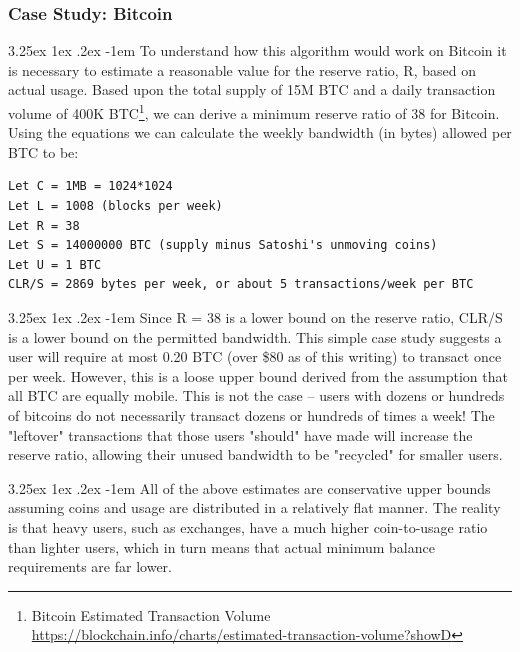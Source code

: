 \documentclass{article}
\makeatletter
\renewcommand\paragraph{\@startsection{paragraph}{5}{\z@}%
  {3.25ex \@plus1ex \@minus.2ex}%
  {-1em}%
  {\normalfont\normalsize\bfseries}}
\makeatother
\begin{document}
            \subsubsection{Case Study: Bitcoin}

                \paragraph{}
                    To understand how this algorithm would work on Bitcoin
it is necessary to estimate a reasonable value for the reserve ratio, R,
based on actual usage. Based upon the total supply of 15M BTC and a daily
transaction volume of 400K BTC\footnote{Bitcoin Estimated Transaction
Volume\newline
\url{https://blockchain.info/charts/estimated-transaction-volume?showD}},
we can derive a minimum reserve ratio of 38 for Bitcoin. Using the
equations we can calculate the weekly bandwidth (in bytes) allowed per BTC
to be:

                \begin{lstlisting}
Let C = 1MB = 1024*1024
Let L = 1008 (blocks per week)
Let R = 38
Let S = 14000000 BTC (supply minus Satoshi's unmoving coins)
Let U = 1 BTC
CLR/S = 2869 bytes per week, or about 5 transactions/week per BTC
                \end{lstlisting}

                \paragraph{}
                    Since R = 38 is a lower bound on the reserve ratio,
CLR/S is a lower bound on the permitted bandwidth. This simple case study
suggests a user will require at most 0.20 BTC (over \$80 as of this
writing) to transact once per week. However, this is a loose upper bound
derived from the assumption that all BTC are equally mobile. This is not
the case -- users with dozens or hundreds of bitcoins do not necessarily
transact dozens or hundreds of times a week! The "leftover" transactions
that those users "should" have made will increase the reserve ratio,
allowing their unused bandwidth to be "recycled" for smaller users.

                \paragraph{}
                    All of the above estimates are conservative upper
bounds assuming coins and usage are distributed in a relatively flat
manner. The reality is that heavy users, such as exchanges, have a much
higher coin-to-usage ratio than lighter users, which in turn means that
actual minimum balance requirements are far lower.
\end{document}
